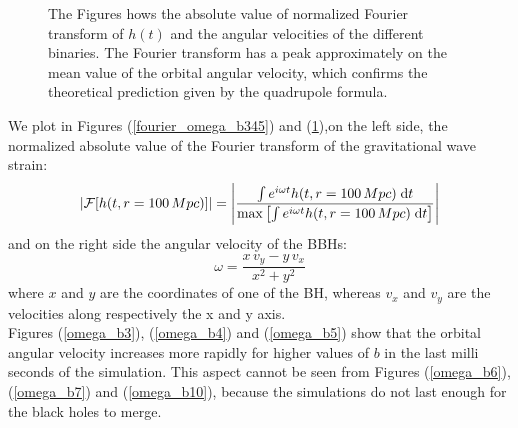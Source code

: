 \begin{figure}[]
   \quad

  \quad
{}
   
   
\caption{The Figures hows the absolute  value of normalized Fourier transform of $h(t)$ and the angular velocities of the different binaries. The Fourier transform has a peak approximately on the mean value of the orbital angular velocity, which confirms the theoretical prediction given by the quadrupole formula.}
\label{fourier_omega_b6710}

\end{figure}
We plot in Figures (\ref{fourier_omega_b345}) and (\ref{fourier_omega_b6710}),on the left side, the normalized absolute value of the Fourier transform of the gravitational wave strain:
\[
\abs{\mathcal{F}[h(t,r=100 \, Mpc)]} = \abs{
\dfrac{\int e^{i \omega t}  h(t,r=100 \, Mpc) \;\dd t }{\max \qty[\int e^{i \omega t}  h(t,r=100 \, Mpc) \;\dd t] }
}
\]
and on the right side the angular velocity of the BBHs:
\[
\omega = \dfrac{x \, v_y - y \,v_x}{x^{2}+y^{2}}
\]
where $x$ and $y$ are the coordinates of one of the BH, whereas $v_x$ and $v_y$ are the velocities along respectively the x and y axis.\\
Figures (\ref{omega_b3}), (\ref{omega_b4}) and (\ref{omega_b5}) show that the orbital angular velocity increases more rapidly for higher values of $b$ in the last milli seconds of the simulation. 
This aspect cannot be seen from Figures (\ref{omega_b6}), (\ref{omega_b7}) and (\ref{omega_b10}), because the simulations do not last enough for the black holes to merge. 
